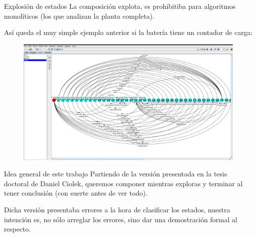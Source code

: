 \begin{frame}{Explosión de estados}
    La composición explota, es prohibitiba para algoritmos monolíticos (los que analizan la planta completa).
    
    Así queda el muy simple ejemplo anterior si la batería tiene un contador de carga:
    \begin{figure}
    	\includegraphics[width=\textwidth]{figures/big-plant.png}
    \end{figure}
\end{frame}
\begin{frame}{Idea general de este trabajo}
    Partiendo de la versión presentada en la tesis doctoral de Daniel Ciolek, queremos componer mientras exploras y terminar al tener conclusión (con suerte antes de ver todo).
    
    Dicha versión presentaba errores a la hora de clasificar los estados, nuestra intención es, no sólo arreglar los errores, sino dar una demostración formal al respecto.
    
\end{frame}
